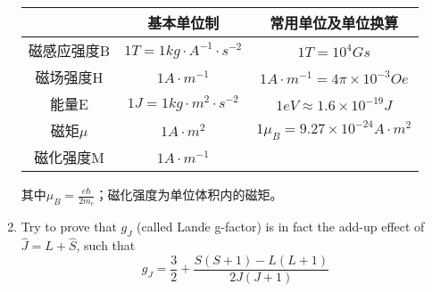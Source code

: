\documentclass[reqno,a4paper,12pt]{amsart}
\begin{document}
\begin{enumerate}[1]
\begin{tcolorbox}[colback = black!5!white, colframe = black]
\begin{table}[H]
	\begin{center}
	\begin{tabular}{|c|c|c|}
		\hline
		 & 基本单位制 & 常用单位及单位换算 \\
		\hline
		磁感应强度B & $1T = 1kg \cdot A^{-1} \cdot s^{-2}$ & $1T = 10^4Gs$ \\
		\hline 
		磁场强度H & $1A\cdot m^{-1}$ & $1A\cdot m^{-1} = 4\pi\times 10^{-3} Oe$ \\
		\hline
		能量E & $1J = 1kg \cdot m^2 \cdot s^{-2}$ & $1eV \approx 1.6\times 10^{-19} J$ \\
		\hline
		磁矩$\mu$ & $1A\cdot m^2$ & $1\mu_B = 9.27\times10^{-24}A\cdot m^{2}$ \\
		\hline
		磁化强度M & $1A\cdot m^{-1}$ &  \\
		\hline
	\end{tabular}
	\end{center}
\end{table}
其中$\mu_B = \frac{e\hbar}{2m_e}$；磁化强度为单位体积内的磁矩。
\end{tcolorbox}


\item Try to prove that $g_J$ (called Land$\acute{\text{e}}$ g-factor) is in fact the add-up effect of $\hat{J} = \hat{L} + \hat{S}$, such that
\begin{equation}
	g_J = \frac{3}{2} + \frac{S(S+1)-L(L+1)}{2J(J+1)}
\end{equation}

\begin{tcolorbox}[colback = black!5!white, colframe = black, breakable]



\end{tcolorbox}
\end{enumerate}
\end{document}
